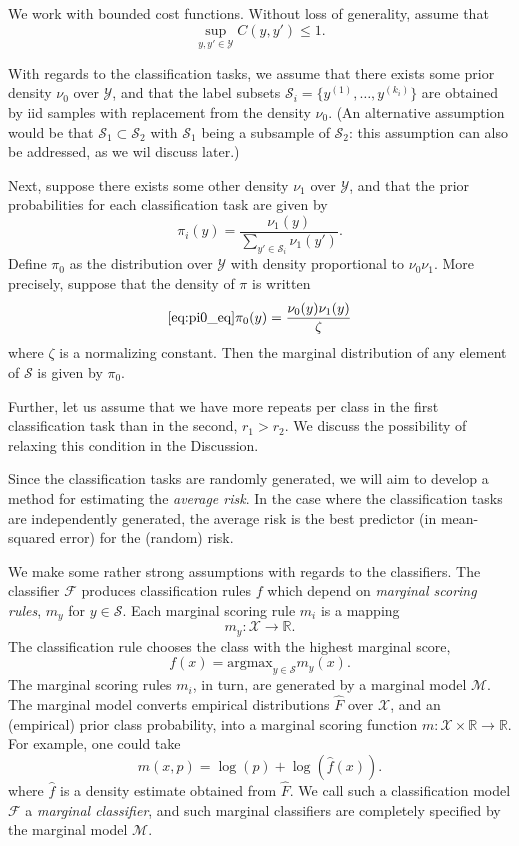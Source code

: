 \documentclass[12pt]{article}
\begin{document}
We work with bounded cost functions.  Without loss of generality,
assume that
\[
\sup_{y, y'\in \mathcal{Y}} C(y, y') \leq 1.
\]

With regards to the classification tasks, we assume that there exists
some prior density $\nu_0$ over $\mathcal{Y}$,
and that the label subsets $\mathcal{S}_i = \{y^{(1)}, \hdots,
y^{(k_i)}\}$ are obtained by iid samples with replacement from the density $\nu_0$.
(An alternative assumption would be that $\mathcal{S}_1 \subset
\mathcal{S}_2$ with $\mathcal{S}_1$ being a subsample of
$\mathcal{S}_2$: this assumption can also be addressed, as we wil
discuss later.)

Next, suppose there exists some other density $\nu_1$ over
$\mathcal{Y}$, and that the prior probabilities for each
classification task are given by
\[
\pi_i(y) = \frac{\nu_1(y)}{\sum_{y' \in \mathcal{S}_i} \nu_1(y')}.
\]
Define $\pi_0$ as the distribution over $\mathcal{Y}$ with density
proportional to $\nu_0 \nu_1$. More precisely, suppose that the density of $\pi$ is written
\begin{equation}\eqref{eq:pi0_eq}
\pi_0(y) = \frac{\nu_0(y) \nu_1(y)}{\zeta}
\end{equation}
where $\zeta$ is a normalizing constant.
Then the marginal distribution of any
element of $\mathcal{S}$ is given by $\pi_0$.

Further, let us assume that we have more repeats per class in the
first classification task than in the second, $r_1 > r_2$.  We discuss
the possibility of relaxing this condition in the Discussion.

Since the classification tasks are randomly generated, we will aim to
develop a method for estimating the \emph{average risk}.  In the case
where the classification tasks are independently generated, the
average risk is the best predictor (in mean-squared error) for the
(random) risk.

We make some rather strong assumptions with regards to the
classifiers.  The classifier $\mathcal{F}$ produces classification
rules $f$ which depend on \emph{marginal scoring rules}, $m_y$ for $y
\in \mathcal{S}$.  Each marginal scoring rule $m_i$ is a mapping
\[
m_y: \mathcal{X} \to \mathbb{R}.
\]
The classification rule chooses the class with the highest marginal score,
\[
f(x) = \text{argmax}_{y \in \mathcal{S}} m_y(x).
\]
The marginal scoring rules $m_i$, in turn, are generated by a marginal
model $\mathcal{M}$.  The marginal model converts empirical
distributions $\hat{F}$ over $\mathcal{X}$, and an (empirical) prior
class probability, into a marginal scoring function $m: \mathcal{X}
\times \mathbb{R} \to \mathbb{R}$.  For example, one could take 
\[m(x,p) = \log(p) + \log(\hat{f}(x)).\]
where $\hat{f}$ is a density estimate obtained from
$\hat{F}$.  We call such a classification model $\mathcal{F}$ a
\emph{marginal classifier}, and such marginal classifiers are
completely specified by the marginal model $\mathcal{M}.$
\end{document}
